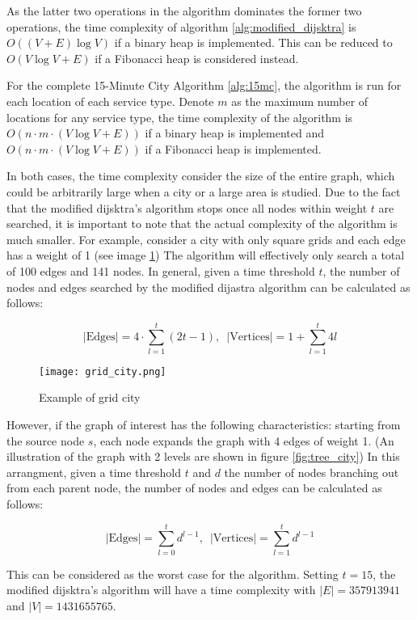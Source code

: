 As the latter two operations in the algorithm dominates the former two operations, the time complexity of algorithm \ref{alg:modified_dijsktra} is $O((V+E)\log V)$ if a binary heap is implemented. This can be reduced to $O(V\log V+E)$ if a Fibonacci heap is considered instead.

For the complete 15-Minute City Algorithm \ref{alg:15mc}, the algorithm is run for each location of each service type. Denote $m$ as the maximum number of locations for any service type, the time complexity of the algorithm is $O(n\cdot m\cdot(V\log V+E))$ if a binary heap is implemented and $O(n\cdot m\cdot(V\log V+E))$ if a Fibonacci heap is implemented. 

In both cases, the time complexity consider the size of the entire graph, which could be arbitrarily large when a city or a large area is studied. Due to the fact that the modified dijsktra's algorithm stops once all nodes within weight $t$ are searched, it is important to note that the actual complexity of the algorithm is much smaller. For example, consider a city with only square grids and each edge has a weight of 1 (see image \ref{fig:grid_city}) The algorithm will effectively only search a total of 100 edges and 141 nodes. In general, given a time threshold $t$, the number of nodes and edges searched by the modified dijastra algorithm can be calculated as follows:

$$|\text{Edges}|=4\cdot\sum^{t}_{l=1}(2t-1),\enspace|\text{Vertices}|=1+\sum^{t}_{l=1}4l$$

\begin{figure}[h]
    \caption{Example of grid city}
    \centering
    \texttt{[image: grid\_city.png]}
    \label{fig:grid_city}
\end{figure}

However, if the graph of interest has the following characteristics: starting from the source node $s$, each node expands the graph with 4 edges of weight 1. (An illustration of the graph with 2 levels are shown in figure \ref{fig:tree_city}) In this arrangment, given a time threshold $t$ and $d$ the number of nodes branching out from each parent node, the number of nodes and edges can be calculated as follows:

$$|\text{Edges}|=\sum^{t}_{l=0}d^{l-1},\enspace|\text{Vertices}|=\sum^{t}_{l=1}d^{l-1}$$

This can be considered as the worst case for the algorithm. Setting $t=15$, the modified dijsktra's algorithm will have a time complexity with $|E|=357913941$ and $|V|=1431655765$.

